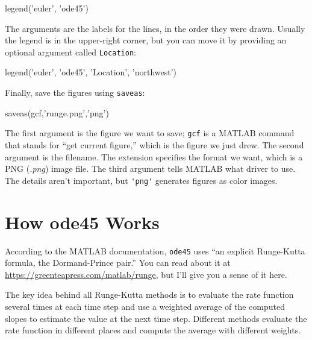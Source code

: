 \begin{code}
legend('euler', 'ode45')
\end{code}


The arguments are the labels for the lines, in the order they were drawn.  Usually the legend is in the upper-right corner, but you can move it by providing an optional argument called \lstinline{Location}:

\begin{code}
legend('euler', 'ode45', 'Location', 'northwest')
\end{code}

Finally,  save the figures using \lstinline{saveas}:

\begin{code}
saveas(gcf,'runge.png','png')
\end{code}

The first argument is the figure we want to save; \lstinline{gcf} is a MATLAB command that stands for ``get current figure,'' which is the figure we just drew.  The second argument is the filename.  The extension specifies the format we want, which is a PNG (\emph{.png}) image file.  The third argument tells MATLAB what driver to use.  The details aren't important, but \lstinline{'png'} generates figures as color images.



\section{How ode45 Works}
\label{s:howode45}

According to the MATLAB documentation, \lstinline{ode45} uses ``an explicit Runge-Kutta formula, the Dormand-Prince pair.''  You can read about it at  \url{https://greenteapress.com/matlab/runge}, but I'll give you a sense of it here.


The key idea behind all Runge-Kutta methods is to evaluate the rate function several times at each time step and use a weighted average of the computed slopes to estimate the value at the next time step.
Different methods evaluate the rate function in different places and compute the average with different weights.


